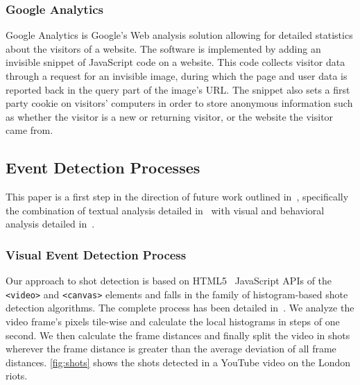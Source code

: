 \documentclass[runningheads,a4paper]{llncs}
\begin{document}
\subsubsection{Google Analytics}
Google Analytics is Google's Web analysis solution allowing for detailed statistics about the visitors of a website. The software is implemented by adding an invisible snippet of JavaScript code on a website. This code collects visitor data through a request for an invisible image, during which the page and user data is reported back in the query part of the image's URL. The snippet also sets a first party cookie on visitors' computers in order to store anonymous information such as whether the visitor is a new or returning visitor, or the website the visitor came from.

\subsection{Event Detection Processes}
This paper is a first step in the direction of future work outlined in~\cite{artemis}, specifically the combination of textual analysis detailed in~\cite{semwebvid} with visual and behavioral analysis detailed in~\cite{artemis}. 

\subsubsection{Visual Event Detection Process}
Our approach to shot detection is based on HTML5~\cite{w3c_html5} JavaScript APIs of the \texttt{<video>} and \texttt{<canvas>} elements and falls in the family of histogram-based shote detection algorithms. The complete process has been detailed in~\cite{artemis}. We analyze the video frame's pixels tile-wise and calculate the local histograms in steps of one second. We then calculate the frame distances and finally split the video in shots wherever the frame distance is greater than the average deviation of all frame distances. \autoref{fig:shots} shows the shots detected in a YouTube video on the London riots.
\end{document}
